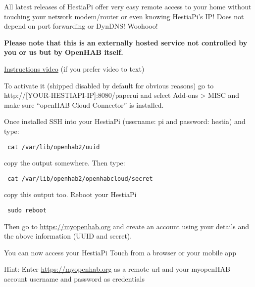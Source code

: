 All latest releases of HestiaPi offer very easy remote access to your home
without touching your network modem/router or even knowing HestiaPi's IP! Does
not depend on port forwarding or DynDNS! Woohooo!

\textbf{Please note that this is an externally hosted service not controlled by
you or us but by OpenHAB itself.}

\href{https://www.youtube.com/watch?v=joz5f4ejJVc}{Instructions video} (if you
prefer video to text)

To activate it (shipped disabled by default for obvious reasons) go to
http://[YOUR-HESTIAPI-IP]:8080/paperui and select Add-ons > MISC and make
sure ``openHAB Cloud Connector'' is installed.

Once installed SSH into your HestiaPi (username: pi and password: hestia) and
type:

\texttt{    cat /var/lib/openhab2/uuid}

 copy the output somewhere. Then type:

\texttt{        cat /var/lib/openhab2/openhabcloud/secret}

copy this output too. Reboot your HestiaPi

\texttt{        sudo reboot}

    
Then go to \url{https://myopenhab.org} and create an account using your details
and the above information (UUID and secret).

You can now access your HestiaPi Touch from a browser or your mobile app

Hint: Enter \url{https://myopenhab.org} as a remote url and your myopenHAB
account username and password as credentials
